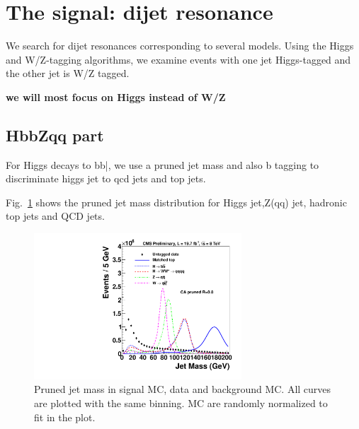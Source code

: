 \section{The signal: dijet resonance}
\label{sec:signal}

We search for dijet resonances corresponding to several models.
Using the Higgs and  W/Z-tagging algorithms, 
we examine events with one jet Higgs-tagged and the other jet is W/Z tagged. 

{\bf we will most focus on Higgs instead of W/Z}

\subsection{HbbZqq part}


For Higgs decays to bb\bar, we use a pruned jet mass and also b tagging to 
discriminate higgs jet to qcd jets and top jets. 

Fig.~\ref{fig:HbbjetMass} shows the pruned jet mass distribution for Higgs jet,Z(qq) jet, 
hadronic top jets and QCD jets. 


\begin{figure}[htb]
\begin{center}
\includegraphics[width=0.69\textwidth]{HbbZqqfigs/Signal/signal-data-qcd-jetmass.pdf}
\end{center}
\caption{Pruned jet mass in signal MC, data and background MC.
All curves are plotted with the same binning.
MC are randomly normalized to fit in the plot. 
}
\label{fig:HbbjetMass}
\end{figure}

